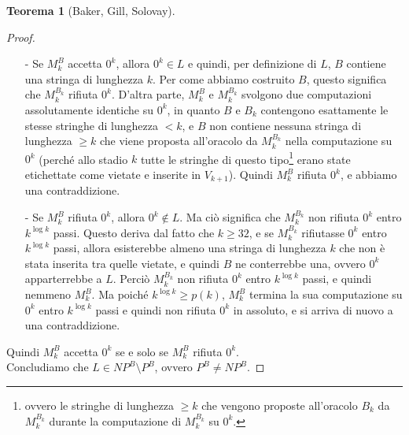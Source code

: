 \documentclass[12pt,a4paper]{report}
\theoremstyle{definition}
\newtheorem{teo}{Teorema}[section]  %
\begin{document}
\begin{teo}[Baker, Gill, Solovay]
\begin{proof}
\begin{itemize}
\item[-] Se $M_k^B$ accetta $0^k$, allora $0^k \in L$ e quindi, per definizione di $L$, $B$ contiene una stringa di lunghezza $k$. Per come abbiamo costruito $B$, questo significa che $M_k^{B_k}$ rifiuta $0^k$. D'altra parte, $M_k^B$ e $M_k^{B_k}$ svolgono due computazioni assolutamente identiche su $0^k$, in quanto $B$ e $B_k$ contengono esattamente le stesse stringhe di lunghezza $<k$, e $B$ non contiene nessuna stringa di lunghezza $\geq k$ che viene proposta all'oracolo da $M_k^{B_k}$ nella computazione su $0^k$ (perché allo stadio $k$ tutte le stringhe di questo tipo\footnote{ovvero le stringhe di lunghezza $\geq k$ che vengono proposte all'oracolo $B_k$ da $M_k^{B_k}$ durante la computazione di $M_k^{B_k}$ su $0^k$.} erano state etichettate come vietate e inserite in $V_{k+1}$). Quindi $M_k^B$ rifiuta $0^k$, e abbiamo una contraddizione.
\item[-] Se $M_k^B$ rifiuta $0^k$, allora $0^k \not\in L$. Ma ciò significa che $M_k^{B_k}$ non rifiuta $0^k$ entro $k^{\log k}$ passi. Questo deriva dal fatto che $k \geq 32$, e se $M_k^{B_k}$ rifiutasse $0^k$ entro $k^{\log k}$ passi, allora esisterebbe almeno una stringa di lunghezza $k$ che non è stata inserita tra quelle vietate, e quindi $B$ ne conterrebbe una, ovvero $0^k$ apparterrebbe a $L$. Perciò $M_k^{B_k}$ non rifiuta $0^k$ entro $k^{\log k}$ passi, e quindi nemmeno $M_k^B$. Ma poiché $k^{\log k} \geq p(k)$, $M_k^B$ termina la sua computazione su $0^k$ entro $k^{\log k}$ passi e quindi non rifiuta $0^k$ in assoluto, e si arriva di nuovo a una contraddizione.
\end{itemize}
Quindi $M_k^B$ accetta $0^k$ se e solo se $M_k^B$ rifiuta $0^k$.\\
Concludiamo che $L \in NP^B \setminus P^B$, ovvero $P^B \neq NP^B$.
\end{proof}
\end{teo}
\end{document}
